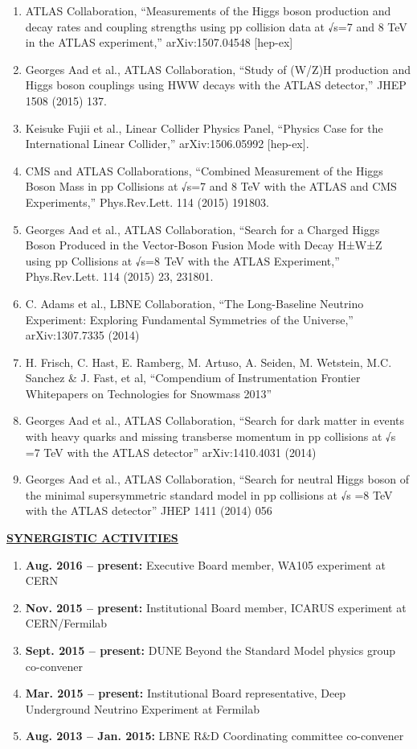 \begin{enumerate}[noitemsep]
\item ATLAS Collaboration, “Measurements of the Higgs boson production and decay rates and coupling strengths using pp collision data at √s=7 and 8 TeV in the ATLAS experiment,” arXiv:1507.04548 [hep-ex]
\item Georges Aad et al., ATLAS Collaboration, “Study of (W/Z)H production and Higgs boson couplings using HWW decays with the ATLAS detector,” JHEP 1508 (2015) 137.
\item Keisuke Fujii et al., Linear Collider Physics Panel, “Physics Case for the International Linear Collider,” arXiv:1506.05992 [hep-ex].
\item CMS and ATLAS Collaborations, “Combined Measurement of the Higgs Boson Mass in pp Collisions at √s=7 and 8 TeV with the ATLAS and CMS Experiments,” Phys.Rev.Lett. 114 (2015) 191803.
\item Georges Aad et al., ATLAS Collaboration, “Search for a Charged Higgs Boson Produced in the Vector-Boson Fusion Mode with Decay H±W±Z using pp Collisions at √s=8  TeV with the ATLAS Experiment,” Phys.Rev.Lett. 114 (2015) 23, 231801.
\item C. Adams et al., LBNE Collaboration, “The Long-Baseline Neutrino Experiment: Exploring Fundamental Symmetries of the Universe,” arXiv:1307.7335 (2014)
\item H. Frisch, C. Hast, E. Ramberg, M. Artuso, A. Seiden, M. Wetstein, M.C. Sanchez \& J. Fast, et al, “Compendium of Instrumentation Frontier Whitepapers on Technologies for Snowmass 2013” 
\item Georges Aad et al., ATLAS Collaboration, “Search for dark matter in events with heavy quarks and missing transberse momentum in pp collisions at √s =7 TeV with the ATLAS detector” arXiv:1410.4031 (2014)
\item Georges Aad et al., ATLAS Collaboration, “Search for neutral Higgs boson of the minimal supersymmetric standard model in pp collisions at √s =8 TeV with the ATLAS detector” JHEP 1411 (2014) 056
\end{enumerate}
%
{\underline{\underline{{\bf SYNERGISTIC ACTIVITIES}}}}
\begin{enumerate}[noitemsep]
\item {\bf Aug. 2016 – present:} Executive Board member, WA105 experiment at CERN
\item {\bf Nov. 2015 – present:} Institutional Board member, ICARUS experiment at CERN/Fermilab
\item {\bf Sept. 2015 – present:} DUNE Beyond the Standard Model physics group co-convener
\item {\bf Mar. 2015 – present:} Institutional Board representative, Deep Underground Neutrino Experiment at Fermilab
\item {\bf Aug. 2013 – Jan. 2015:} LBNE R\&D Coordinating committee co-convener
\end{enumerate}
